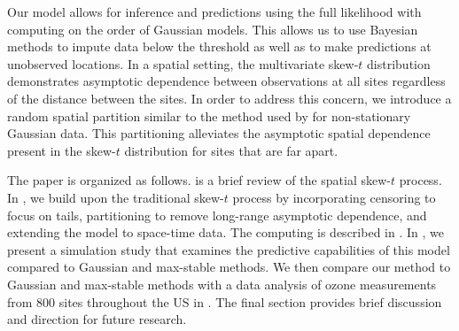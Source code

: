 \documentclass[useAMS,usenatbib,referee]{biom}
\begin{document}
Our model allows for inference and predictions using the full likelihood with computing on the order of Gaussian models.
This allows us to use Bayesian methods to impute data below the threshold as well as to make predictions at unobserved locations.
In a spatial setting, the multivariate skew-$t$ distribution demonstrates asymptotic dependence between observations at all sites regardless of the distance between the sites.
In order to address this concern, we introduce a random spatial partition similar to the method used by \citet{Kim2005} for non-stationary Gaussian data.
This partitioning alleviates the asymptotic spatial dependence present in the skew-$t$ distribution for sites that are far apart.

The paper is organized as follows.
 is a brief review of the spatial skew-$t$ process.
In , we build upon the traditional skew-$t$ process by incorporating censoring to focus on tails, partitioning to remove long-range asymptotic dependence, and extending the model to space-time data.
The computing is described in .
In , we present a simulation study that examines the predictive capabilities of this model compared to Gaussian and max-stable methods.
We then compare our method to Gaussian and max-stable methods with a data analysis of ozone measurements from 800 sites throughout the US in .
The final section provides brief discussion and direction for future research.


\end{document}
